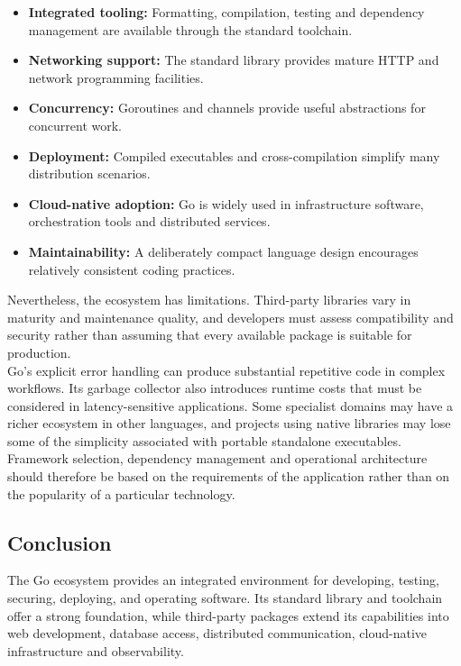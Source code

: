 \begin{itemize}
    \item \textbf{Integrated tooling:} Formatting, compilation, testing and dependency management are available through the standard toolchain.
    \item \textbf{Networking support:} The standard library provides mature HTTP and network programming facilities.
    \item \textbf{Concurrency:} Goroutines and channels provide useful abstractions for concurrent work.
    \item \textbf{Deployment:} Compiled executables and cross-compilation simplify many distribution scenarios.
    \item \textbf{Cloud-native adoption:} Go is widely used in infrastructure software, orchestration tools and distributed services.
    \item \textbf{Maintainability:} A deliberately compact language design encourages relatively consistent coding practices.
\end{itemize}

Nevertheless, the ecosystem has limitations. Third-party libraries vary in maturity and maintenance quality, and developers must assess compatibility and security rather than assuming that every available package is suitable for production.\\

Go's explicit error handling can produce substantial repetitive code in complex workflows. Its garbage collector also introduces runtime costs that must be considered in latency-sensitive applications. Some specialist domains may have a richer ecosystem in other languages, and projects using native libraries may lose some of the simplicity associated with portable standalone executables.\\

Framework selection, dependency management and operational architecture should therefore be based on the requirements of the application rather than on the popularity of a particular technology.

\subsection{Conclusion}

The Go ecosystem provides an integrated environment for developing, testing, securing, deploying, and operating software. Its standard library and toolchain offer a strong foundation, while third-party packages extend its capabilities into web development, database access, distributed communication, cloud-native infrastructure and observability.\\

